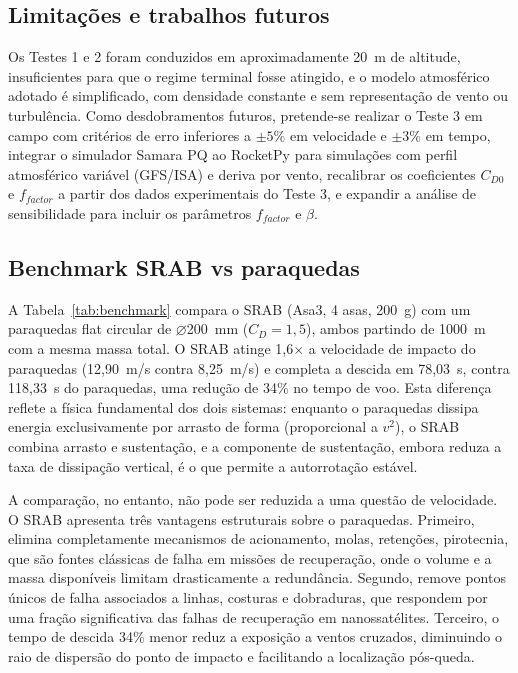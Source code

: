 \documentclass[12pt,fleqn]{article}
\begin{document}
\subsection{Limitações e trabalhos futuros}

Os Testes 1 e 2 foram conduzidos em aproximadamente 20~m de altitude, insuficientes para que o regime terminal fosse atingido, e o modelo atmosférico adotado é simplificado, com densidade constante e sem representação de vento ou turbulência. Como desdobramentos futuros, pretende-se realizar o Teste 3 em campo com critérios de erro inferiores a $\pm5\%$ em velocidade e $\pm3\%$ em tempo, integrar o simulador Samara PQ ao RocketPy \citep{rocketpy2024} para simulações com perfil atmosférico variável (GFS/ISA) e deriva por vento, recalibrar os coeficientes $C_{D0}$ e $f_{factor}$ a partir dos dados experimentais do Teste 3, e expandir a análise de sensibilidade para incluir os parâmetros $f_{factor}$ e $\beta$.

\subsection{Benchmark SRAB vs paraquedas}

A Tabela~\ref{tab:benchmark} compara o SRAB (Asa3, 4 asas, 200~g) com um paraquedas flat circular de $\varnothing$200~mm ($C_D = 1,5$), ambos partindo de 1000~m com a mesma massa total. O SRAB atinge 1,6$\times$ a velocidade de impacto do paraquedas (12,90~m/s contra 8,25~m/s) e completa a descida em 78,03~s, contra 118,33~s do paraquedas, uma redução de 34\% no tempo de voo. Esta diferença reflete a física fundamental dos dois sistemas: enquanto o paraquedas dissipa energia exclusivamente por arrasto de forma (proporcional a $v^2$), o SRAB combina arrasto e sustentação, e a componente de sustentação, embora reduza a taxa de dissipação vertical, é o que permite a autorrotação estável.

A comparação, no entanto, não pode ser reduzida a uma questão de velocidade. O SRAB apresenta três vantagens estruturais sobre o paraquedas. Primeiro, elimina completamente mecanismos de acionamento, molas, retenções, pirotecnia, que são fontes clássicas de falha em missões de recuperação, onde o volume e a massa disponíveis limitam drasticamente a redundância. Segundo, remove pontos únicos de falha associados a linhas, costuras e dobraduras, que respondem por uma fração significativa das falhas de recuperação em nanossatélites. Terceiro, o tempo de descida 34\% menor reduz a exposição a ventos cruzados, diminuindo o raio de dispersão do ponto de impacto e facilitando a localização pós-queda.
\end{document}

